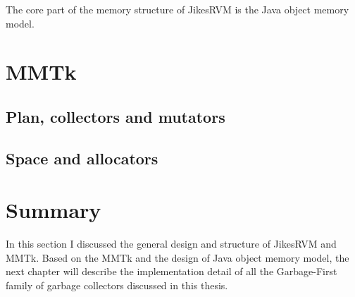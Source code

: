 The core part of the memory structure of JikesRVM is the Java object memory model.



\section{MMTk}
\label{sec:mmtk}

\subsection{Plan, collectors and mutators}

\subsection{Space and allocators}

\section{Summary}

In this section I discussed the general design and structure of JikesRVM and MMTk.
Based on the MMTk and the design of Java object memory model, the next chapter will
describe the implementation detail of all the Garbage-First family of garbage collectors
discussed in this thesis.
